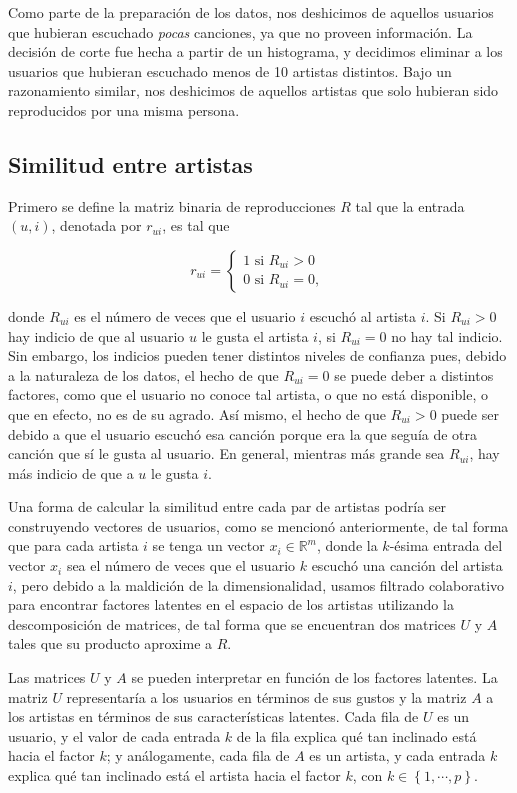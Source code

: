 \documentclass[conference]{IEEEtran}
\begin{document}
Como parte de la preparación de los datos, nos deshicimos de aquellos usuarios que hubieran escuchado \textit{pocas} canciones, ya que no proveen información. La decisión de corte fue hecha a partir de un histograma, y decidimos eliminar a los usuarios que hubieran escuchado menos de 10 artistas distintos. Bajo un razonamiento similar, nos deshicimos de aquellos artistas que solo hubieran sido reproducidos por una misma persona.

\subsection{Similitud entre artistas}

Primero se define la matriz binaria de reproducciones $R$ tal que la entrada $(u, i)$, denotada por $r_{ui}$, es tal que 

\[   
r_{ui} = 
     \begin{cases}
       1 \text{ si } R_{ui} > 0 \\
       0 \text{ si } R_{ui} = 0, \
     \end{cases}
\]

donde $R_{ui}$ es el número de veces que el usuario $i$ escuchó al artista $i$. Si $R_{ui} > 0$ hay indicio de que al usuario $u$ le gusta el artista $i$, si $R_{ui} = 0$ no hay tal indicio. Sin embargo, los indicios pueden tener distintos niveles de confianza pues, debido a la naturaleza de los datos, el hecho de que $R_{ui} = 0$ se puede deber a distintos factores, como que el usuario no conoce tal artista, o que no está disponible, o que en efecto, no es de su agrado. Así mismo, el hecho de que $R_{ui} > 0$ puede ser debido a que el usuario escuchó esa canción porque era la que seguía de otra canción que sí le gusta al usuario. En general, mientras más grande sea $R_{ui}$, hay más indicio de que a $u$ le gusta $i$.

Una forma de calcular la similitud entre cada par de artistas podría ser construyendo vectores de usuarios, como se mencionó anteriormente, de tal forma que para cada artista $i$ se tenga un vector $x_i \in \mathbb{R}^m$, donde la $k$-ésima entrada del vector $x_i$ sea el número de veces que el usuario $k$ escuchó una canción del artista $i$, pero debido a la maldición de la dimensionalidad, usamos filtrado colaborativo para encontrar factores latentes en el espacio de los artistas utilizando la descomposición de matrices, de tal forma que se encuentran dos matrices $U$ y $A$ tales que su producto aproxime a $R$.

Las matrices $U$ y $A$ se pueden interpretar en función de los factores latentes. La matriz $U$ representaría a los usuarios en términos de sus gustos y la matriz $A$ a los artistas en términos de sus características latentes. Cada fila de $U$ es un usuario, y el valor de cada entrada $k$ de la fila explica qué tan inclinado está hacia el factor $k$; y análogamente, cada fila de $A$ es un artista, y cada entrada $k$ explica qué tan inclinado está el artista hacia el factor $k$, con $k \in \left\{1, \cdots, p \right\}$.
\end{document}
